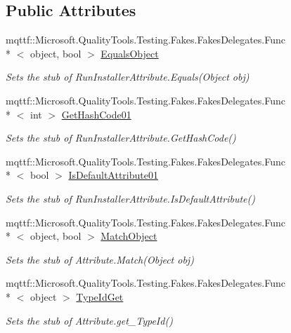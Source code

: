 \subsection*{Public Attributes}
\begin{DoxyCompactItemize}
\item 
mqttf\-::\-Microsoft.\-Quality\-Tools.\-Testing.\-Fakes.\-Fakes\-Delegates.\-Func\\*
$<$ object, bool $>$ \hyperlink{class_system_1_1_component_model_1_1_fakes_1_1_stub_run_installer_attribute_afeffbb63826d957dd4cefa4e6f459a7e}{Equals\-Object}
\begin{DoxyCompactList}\small\item\em Sets the stub of Run\-Installer\-Attribute.\-Equals(\-Object obj)\end{DoxyCompactList}\item 
mqttf\-::\-Microsoft.\-Quality\-Tools.\-Testing.\-Fakes.\-Fakes\-Delegates.\-Func\\*
$<$ int $>$ \hyperlink{class_system_1_1_component_model_1_1_fakes_1_1_stub_run_installer_attribute_a8546e385f7aa35ec88fbac1875a34e8d}{Get\-Hash\-Code01}
\begin{DoxyCompactList}\small\item\em Sets the stub of Run\-Installer\-Attribute.\-Get\-Hash\-Code()\end{DoxyCompactList}\item 
mqttf\-::\-Microsoft.\-Quality\-Tools.\-Testing.\-Fakes.\-Fakes\-Delegates.\-Func\\*
$<$ bool $>$ \hyperlink{class_system_1_1_component_model_1_1_fakes_1_1_stub_run_installer_attribute_a870d3355819ab4319c9cce16f693f93f}{Is\-Default\-Attribute01}
\begin{DoxyCompactList}\small\item\em Sets the stub of Run\-Installer\-Attribute.\-Is\-Default\-Attribute()\end{DoxyCompactList}\item 
mqttf\-::\-Microsoft.\-Quality\-Tools.\-Testing.\-Fakes.\-Fakes\-Delegates.\-Func\\*
$<$ object, bool $>$ \hyperlink{class_system_1_1_component_model_1_1_fakes_1_1_stub_run_installer_attribute_a9ad711d600c10679fe5dc93fa7fd933a}{Match\-Object}
\begin{DoxyCompactList}\small\item\em Sets the stub of Attribute.\-Match(\-Object obj)\end{DoxyCompactList}\item 
mqttf\-::\-Microsoft.\-Quality\-Tools.\-Testing.\-Fakes.\-Fakes\-Delegates.\-Func\\*
$<$ object $>$ \hyperlink{class_system_1_1_component_model_1_1_fakes_1_1_stub_run_installer_attribute_adc14f47e777ba3cd4c0101c9385cf564}{Type\-Id\-Get}
\begin{DoxyCompactList}\small\item\em Sets the stub of Attribute.\-get\-\_\-\-Type\-Id()\end{DoxyCompactList}\end{DoxyCompactItemize}
